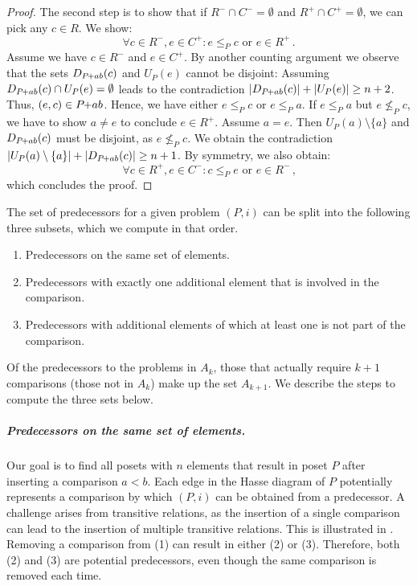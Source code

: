 \documentclass[a4paper,UKenglish,cleveref, autoref, thm-restate, anonymous]{lipics-v2021}
\newcommand{\pchild}[3]{{#1}\kern-1pt{+}{#2}{#3}}
\newcommand{\less}[2]{D_{#1}(#2)}
\newcommand{\greater}[2]{U_{#1}(#2)}
\begin{document}
\begin{proof}
  The second step is to show that if $R^- \cap C^- = \emptyset$ and $R^+ \cap C^+ = \emptyset$, we can pick any $c \in R$.
  We show:
  \begin{equation}
    \forall c \in R^-, e \in C^+ \colon e \le_P c \text{ or } e \in R^+\,\text{.}
  \end{equation}
  Assume we have $c \in R^-$ and $e \in C^+$.
  By another counting argument we observe that the sets $\less{\pchild{P}{a}{b}}{c}$ and $\greater{P}{e}$ cannot be disjoint:
  Assuming $\less{\pchild{P}{a}{b}}{c} \cap \greater{P}{e} = \emptyset$ leads to the contradiction $|\less{\pchild{P}{a}{b}}{c}| + |\greater{P}{e}| \ge n + 2$.
  Thus, $(e, c) \in \pchild{P}{a}{b}$.
  Hence, we have either $e \le_P c$ or $e \le_P a$.
  If $e \le_P a$ but $e \not\le_P c$, we have to show $a \neq e$ to conclude $e \in R^+$.
  Assume $a = e$.
  Then $\greater{P}{a} \setminus \{ a \}$ and $\less{\pchild{P}{a}{b}}{c}$ must be disjoint, as $e \not\le_P c$.
  We obtain the contradiction $|\greater{P}{a} \setminus \{ a \}| + |\less{\pchild{P}{a}{b}}{c}| \ge n + 1$.
  By symmetry, we also obtain:
  \begin{equation}
    \forall c \in R^+, e \in C^- \colon c \le_P e \text{ or } e \in R^-\,\text{,}
  \end{equation}
  which concludes the proof.
\end{proof}

The set of predecessors for a given problem $(P, i)$ can be split into the following three subsets, which we compute in that order.
\begin{enumerate}
  \item Predecessors on the same set of elements.
  \item Predecessors with exactly one additional element that is involved in the comparison.
  \item Predecessors with additional elements of which at least one is not part of the comparison.
\end{enumerate}
Of the predecessors to the problems in $A_k$, those that actually require $k+1$ comparisons (those not in $A_k$) make up the set $A_{k+1}$.
We describe the steps to compute the three sets below.

\subparagraph{Predecessors on the same set of elements.}
Our goal is to find all posets with $n$ elements that result in poset $P$ after inserting a comparison $a < b$.
Each edge in the Hasse diagram of $P$ potentially represents a comparison by which $(P, i)$ can be obtained from a predecessor.
A challenge arises from transitive relations, as the insertion of a single comparison can lead to the insertion of multiple transitive relations.
This is illustrated in .
Removing a comparison from (1) can result in either (2) or (3).
Therefore, both (2) and (3) are potential predecessors, even though the same comparison is removed each time.
\end{document}
